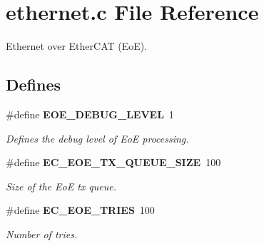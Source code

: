 \section{ethernet.\-c \-File \-Reference}
\label{ethernet_8c}


\-Ethernet over \-Ether\-C\-A\-T (\-Eo\-E).  


\subsection*{\-Defines}
\begin{DoxyCompactItemize}
\item 
\#define {\bf \-E\-O\-E\-\_\-\-D\-E\-B\-U\-G\-\_\-\-L\-E\-V\-E\-L}~1
\begin{DoxyCompactList}\small\item\em \-Defines the debug level of \-Eo\-E processing. \end{DoxyCompactList}\item 
\#define {\bf \-E\-C\-\_\-\-E\-O\-E\-\_\-\-T\-X\-\_\-\-Q\-U\-E\-U\-E\-\_\-\-S\-I\-Z\-E}~100\label{ethernet_8c_a70c1d2d995c7441a4f6e24aa46c08939}

\begin{DoxyCompactList}\small\item\em \-Size of the \-Eo\-E tx queue. \end{DoxyCompactList}\item 
\#define {\bf \-E\-C\-\_\-\-E\-O\-E\-\_\-\-T\-R\-I\-E\-S}~100\label{ethernet_8c_a0e63bd7f607fd32315eef69b1f66835f}

\begin{DoxyCompactList}\small\item\em \-Number of tries. \end{DoxyCompactList}\end{DoxyCompactItemize}
